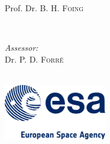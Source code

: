 \begin{titlepage}
\begin{minipage}[t]{0.4\textwidth}
\begin{flushleft}
Prof. Dr. B. H. \textsc{Foing}\\

\end{flushleft}

\end{minipage}

~

\begin{minipage}[t]{0.4\textwidth}

\begin{flushright} \large

\vspace{-3pt}\emph{Assessor:} \\

Dr. P. D. \textsc{Forr\'{e}}\\

\end{flushright}

\end{minipage}\\[2cm]









\includegraphics[width=4.5cm]{Titlepage/ESA-logo/esa-logo.png}\\ %


 




\vfill %



\end{titlepage}